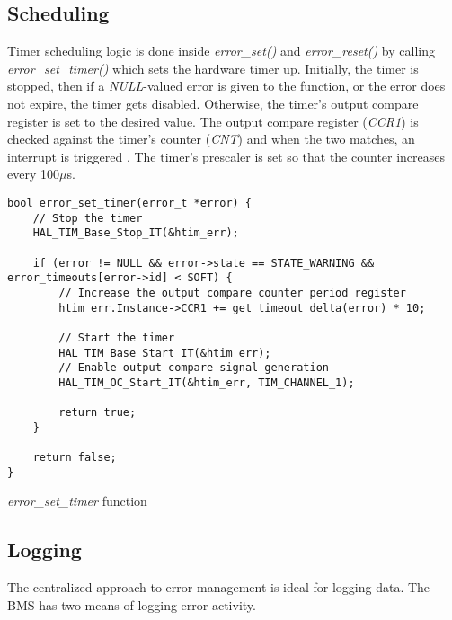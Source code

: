 \subsection{Scheduling}
Timer scheduling logic is done inside \textit{error\_set()} and \textit{error\_reset()} by calling \textit{error\_set\_timer()} which sets the hardware timer up.
Initially, the timer is stopped, then if a \textit{NULL}-valued error is given to the function, or the error does not expire, the timer gets disabled. Otherwise, the timer's output compare register is set to the desired value. The output compare register (\textit{CCR1}) is checked against the timer's counter (\textit{CNT}) and when the two matches, an interrupt is triggered \cite{f446re-ref}. The timer's prescaler is set so that the counter increases every 100$\mu$s.
\begin{listing}[h]
	\begin{verbatim}
bool error_set_timer(error_t *error) {
	// Stop the timer
	HAL_TIM_Base_Stop_IT(&htim_err);

	if (error != NULL && error->state == STATE_WARNING && error_timeouts[error->id] < SOFT) {
		// Increase the output compare counter period register
		htim_err.Instance->CCR1 += get_timeout_delta(error) * 10;

		// Start the timer
		HAL_TIM_Base_Start_IT(&htim_err);
		// Enable output compare signal generation
		HAL_TIM_OC_Start_IT(&htim_err, TIM_CHANNEL_1);

		return true;
	}

	return false;
}
	\end{verbatim}
	\caption{\textit{error\_set\_timer} function}
	\label{code:error_set_timer}
\end{listing}

\subsection{Logging}
The centralized approach to error management is ideal for logging data. The BMS has two means of logging error activity.

